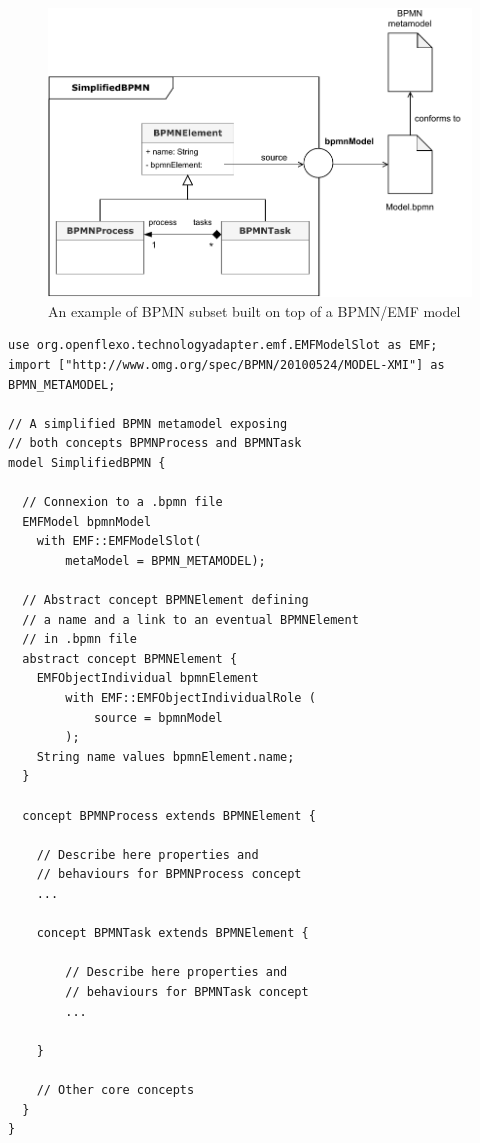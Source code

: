 \begin{figure}[t]
    \centering
    \includegraphics[width=\columnwidth]{Figures/BPMNSubsetExample.pdf}
    \caption{An example of BPMN subset built on top of a BPMN/EMF model}
    \label{fig:BPMNSubsetExample}
\end{figure}

\begin{lstlisting}
use org.openflexo.technologyadapter.emf.EMFModelSlot as EMF;
import ["http://www.omg.org/spec/BPMN/20100524/MODEL-XMI"] as BPMN_METAMODEL;

// A simplified BPMN metamodel exposing
// both concepts BPMNProcess and BPMNTask
model SimplifiedBPMN {

  // Connexion to a .bpmn file
  EMFModel bpmnModel 
    with EMF::EMFModelSlot(
        metaModel = BPMN_METAMODEL);

  // Abstract concept BPMNElement defining
  // a name and a link to an eventual BPMNElement
  // in .bpmn file
  abstract concept BPMNElement {
  	EMFObjectIndividual bpmnElement 
  	    with EMF::EMFObjectIndividualRole (
			source = bpmnModel
		);
    String name values bpmnElement.name;
  }

  concept BPMNProcess extends BPMNElement {

    // Describe here properties and
    // behaviours for BPMNProcess concept
    ...

    concept BPMNTask extends BPMNElement {

        // Describe here properties and
        // behaviours for BPMNTask concept
        ...

    }

    // Other core concepts
  }
}
\end{lstlisting}


